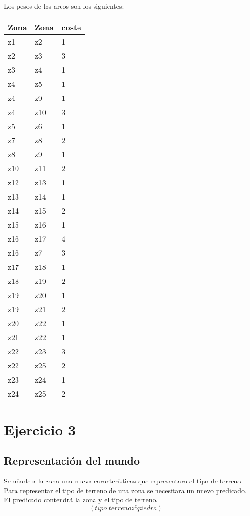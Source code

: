 \documentclass[]{article}
\begin{document}
Los pesos de los arcos son los siguientes:
\begin{table}[htbp]
	\begin{center}
		\begin{tabular}{|l|l|l|}
			\hline
			Zona & Zona & coste \\
			\hline \hline
			z1 & z2 & 1 \\ \hline
			z2 & z3 & 3 \\ \hline
			z3 & z4 & 1 \\ \hline
			z4 & z5 & 1 \\ \hline
			z4 & z9 & 1 \\ \hline
			z4 & z10 & 3  \\ \hline
			z5 & z6 & 1 \\ \hline
			z7 & z8 & 2 \\ \hline
			z8 & z9 & 1 \\ \hline
			z10 & z11 & 2 \\ \hline
			z12 & z13 & 1 \\ \hline
			z13 & z14 & 1 \\ \hline
			z14 & z15 & 2 \\ \hline
			z15 & z16 & 1 \\ \hline
			z16 & z17 & 4 \\ \hline
			z16 & z7 & 3 \\ \hline
			z17 & z18 & 1 \\ \hline
			z18 & z19 & 2 \\ \hline
			z19 & z20 & 1 \\ \hline
			z19 & z21 & 2 \\ \hline
			z20 & z22 & 1 \\ \hline
			z21 & z22 & 1 \\ \hline
			z22 & z23 & 3 \\ \hline
			z22 & z25 & 2 \\ \hline
			z23 & z24 & 1 \\ \hline
			z24 & z25 & 2 \\ \hline
			
			
			
			
		\end{tabular}
	\end{center}
\end{table}
 
\section{Ejercicio 3}
\subsection{Representación del mundo}
Se añade a la zona una nueva características que representara el tipo de terreno. Para representar el tipo de terreno de una zona se necesitara un nuevo predicado. El predicado contendrá la zona y el tipo de terreno. 
$$
(tipo\_terreno z5 piedra)
$$
\end{document}
